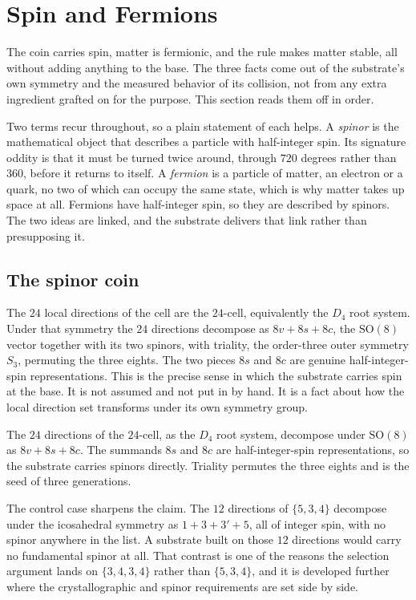 \section{Spin and Fermions}

The coin carries spin, matter is fermionic, and the rule makes matter stable, all without adding anything to the
base. The three facts come out of the substrate's own symmetry and the measured behavior of its collision, not
from any extra ingredient grafted on for the purpose. This section reads them off in order.

Two terms recur throughout, so a plain statement of each helps. A \emph{spinor} is the mathematical object that
describes a particle with half-integer spin. Its signature oddity is that it must be turned twice around, through
$720$ degrees rather than $360$, before it returns to itself. A \emph{fermion} is a particle of matter, an
electron or a quark, no two of which can occupy the same state, which is why matter takes up space at all.
Fermions have half-integer spin, so they are described by spinors. The two ideas are linked, and the substrate
delivers that link rather than presupposing it.

\subsection{The spinor coin}

The $24$ local directions of the cell are the $24$-cell, equivalently the $D_4$ root system. Under that symmetry
the $24$ directions decompose as $8v + 8s + 8c$, the $\mathrm{SO}(8)$ vector together with its two spinors,
with triality, the order-three outer symmetry $S_3$, permuting the three eights. The two pieces $8s$ and $8c$ are
genuine half-integer-spin representations. This is the precise sense in which the substrate carries spin at the
base. It is not assumed and not put in by hand. It is a fact about how the local direction set transforms under
its own symmetry group.

\begin{proposition}
The $24$ directions of the $24$-cell, as the $D_4$ root system, decompose under $\mathrm{SO}(8)$ as
$8v + 8s + 8c$. The summands $8s$ and $8c$ are half-integer-spin representations, so the substrate carries
spinors directly. Triality permutes the three eights and is the seed of three generations.
\end{proposition}

The control case sharpens the claim. The $12$ directions of $\{5,3,4\}$ decompose under the icosahedral
symmetry as $1 + 3 + 3' + 5$, all of integer spin, with no spinor anywhere in the list. A substrate built on
those $12$ directions would carry no fundamental spinor at all. That contrast is one of the reasons the selection
argument lands on $\{3,4,3,4\}$ rather than $\{5,3,4\}$, and it is developed further where the crystallographic
and spinor requirements are set side by side.

